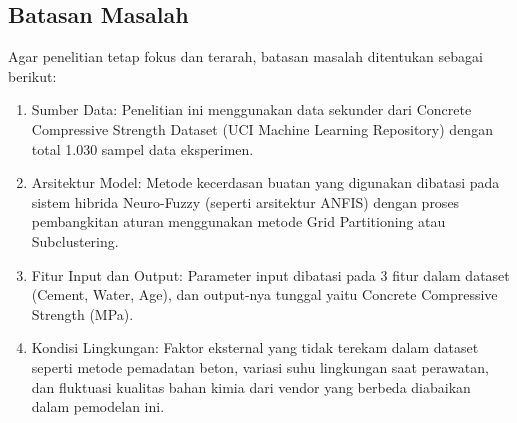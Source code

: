 \subsection{Batasan Masalah}
Agar penelitian tetap fokus dan terarah, batasan masalah ditentukan sebagai berikut:
\begin{enumerate}
    \item Sumber Data: Penelitian ini menggunakan data sekunder dari Concrete Compressive Strength Dataset\cite{concrete_compressive_strength_165} (UCI Machine Learning Repository) dengan total 1.030 sampel data eksperimen.
    \item Arsitektur Model: Metode kecerdasan buatan yang diguna\-kan di\-ba\-ta\-si pada sistem hibrida Neuro-Fuzzy (seperti arsitektur ANFIS) dengan proses pembangkitan aturan menggunakan metode Grid Partitioning atau Subclustering.
    \item Fitur Input dan Output: Parameter input dibatasi pada 3 fitur dalam dataset (Cement, Water, Age), dan output-nya tunggal yaitu Concrete Compressive Strength (MPa).
    \item Kondisi Lingkungan: Faktor eksternal yang ti\-dak te\-re\-kam da\-lam da\-ta\-set seperti metode pemadatan beton, variasi suhu lingkungan saat perawatan, dan fluktuasi kualitas bahan kimia dari vendor yang ber\-be\-da diabaikan dalam pemodelan ini.
\end{enumerate}